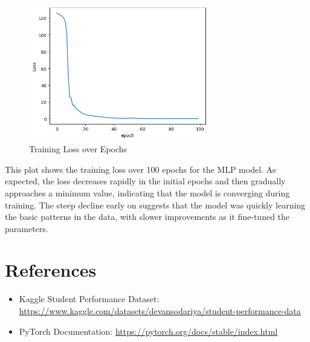 \documentclass[a4paper,12pt]{article}
\begin{document}
\begin{figure}[h]
    \centering
    \includegraphics[width=0.7\textwidth]{output1.png}
    \caption{Training Loss over Epochs}
    \label{fig:training_loss}
\end{figure}
This plot shows the training loss over 100 epochs for the MLP model. As expected, the loss decreases rapidly in the initial epochs and then gradually approaches a minimum value, indicating that the model is converging during training. The steep decline early on suggests that the model was quickly learning the basic patterns in the data, with slower improvements as it fine-tuned the parameters.

\section{References}
\begin{itemize}
    \item Kaggle Student Performance Dataset: \url{https://www.kaggle.com/datasets/devansodariya/student-performance-data}
    \item PyTorch Documentation: \url{https://pytorch.org/docs/stable/index.html}
\end{itemize}
\end{document}
